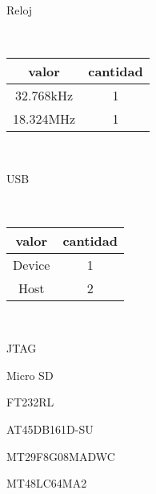 \ 

Reloj

\ 

\begin{tabular}{|c|c|}
\hline 
valor & cantidad\tabularnewline
\hline
\hline 
32.768kHz & 1\tabularnewline
\hline 
18.324MHz & 1\tabularnewline
\hline
\end{tabular}

\ 

USB

\ 

\begin{tabular}{|c|c|}
\hline 
valor & cantidad\tabularnewline
\hline
\hline 
Device & 1\tabularnewline
\hline 
Host & 2\tabularnewline
\hline
\end{tabular}

\ 

JTAG

Micro SD

FT232RL

AT45DB161D-SU

MT29F8G08MADWC

MT48LC64MA2


